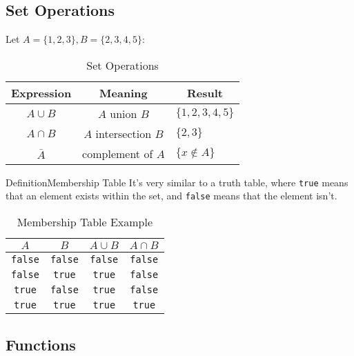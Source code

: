 \documentclass{MathNotes}
\newenvironment{definition}[1]{\begin{RedBox}{Definition}{#1}}{\end{RedBox}}
\begin{document}
\subsection{Set Operations}
Let $A=\{1,2,3\},B=\{2,3,4,5\}$:
\begin{table}[h!]
	\centering
	\caption{Set Operations}
	\begin{tabular}{ccl}
		\multicolumn{1}{c}{\textbf{Expression}} &
		\multicolumn{1}{c}{\textbf{Meaning}}    &
		\multicolumn{1}{c}{\textbf{Result}}                                               \\
		\midrule
		$A\cup B$                               & $A$ union $B$        & $\{1,2,3,4,5\}$  \\
		$A\cap B$                               & $A$ intersection $B$ & $\{2,3\}$        \\
		$\bar{A}$                               & complement of $A$    & $\{x\not\in A\}$ \\
	\end{tabular}
\end{table}
\begin{definition}{Membership Table}\label{def:membership-table}
	It's very similar to a truth table, where \texttt{true} means that an element exists within the set, and \texttt{false} means that the element isn't.
\end{definition}

\begin{table}[h!]
	\centering
	\caption{Membership Table Example}
	\begin{tabular}{cc|c|c}
		$A$            & $B$            & $A\cup B$      & $A\cap B$      \\
		\midrule
		\texttt{false} & \texttt{false} & \texttt{false} & \texttt{false} \\
		\texttt{false} & \texttt{true}  & \texttt{true}  & \texttt{false} \\
		\texttt{true}  & \texttt{false} & \texttt{true}  & \texttt{false} \\
		\texttt{true}  & \texttt{true}  & \texttt{true}  & \texttt{true}
	\end{tabular}
\end{table}

\newpage
\subsection{Functions}
\end{document}
